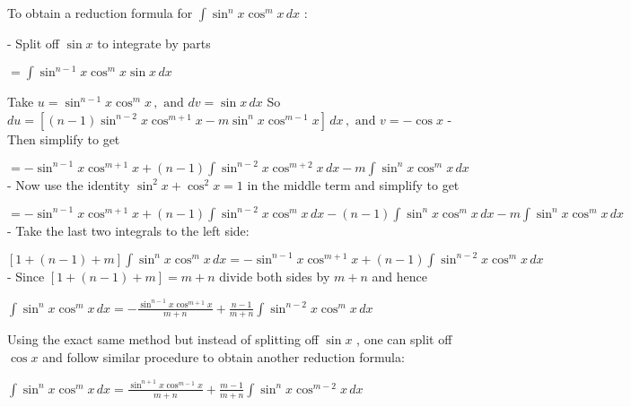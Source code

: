 \documentclass[12pt]{article}
\begin{document}
To obtain a reduction formula for $\displaystyle \int \sin^n x \cos^m x \, dx$ :

- Split off $\sin x$ to integrate by parts

$\displaystyle = \int \sin^{n-1} x \cos^m x \sin x \, dx$

Take $\displaystyle u = \sin^{n-1} x \cos^m x\,, \text{   and }dv = \sin x \, dx$ \linebreak
So   $\displaystyle du = [(n-1)\sin^{n-2} x \cos^{m+1} x - m \sin ^n x \cos^{m-1} x] \, dx\,, \text{   and }v = - \cos x$ \linebreak
\newline
- Then simplify to get

$\displaystyle = - \sin^{n-1} x \cos^{m+1} x + (n-1) \int \sin^{n-2} x \cos^{m+2} x \, dx - m \int \sin^n x \cos^m x \, dx$\linebreak
\newline
- Now use the identity $\displaystyle \sin^2 x + \cos^2 x = 1$ in the middle term and simplify to get

$\displaystyle = - \sin^{n-1} x \cos^{m+1} x + (n-1) \int \sin^{n-2} x \cos^m x \, dx - (n-1) \int \sin^n x \cos^m x \, dx - m \int \sin^n x \cos^m x \, dx$\linebreak
\newline
- Take the last two integrals to the left side:

$\displaystyle [1+(n-1)+m] \int \sin^n x \cos^m x \, dx = - \sin^{n-1} x \cos^{m+1} x + (n-1) \int \sin^{n-2}x \cos^m x \, dx$\linebreak
\newline
- Since $[1+(n-1)+m]=m+n$ divide both sides by $m+n$ and hence

\begin{center}$\displaystyle \int \sin^n x \cos^m x \, dx = -\frac{\sin^{n-1} x \cos^{m+1} x}{m+n} + \frac{n-1}{m+n} \int \sin^{n-2}x \cos^m x \, dx$\end{center}

Using the exact same method but instead of splitting off $\sin x$ , one can split off $\cos x$ and follow similar procedure to obtain another reduction formula:

\begin{center}$\displaystyle \int \sin^n x \cos^m x \, dx = \frac{\sin^{n+1} x \cos^{m-1} x}{m+n} + \frac{m-1}{m+n} \int \sin^n x \cos^{m-2} x \, dx$\end{center}

\end{document}
